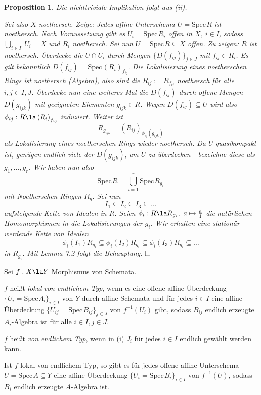 \documentclass[11pt]{book}
\newtheorem{proposition}[theorem]{Proposition}
\theoremstyle{nonumberbreak}
\newenvironment{pr}[1][]{\ifthenelse{\equal{#1}{}}{\proof}{\proof[#1]}\rm}{\endproof}
\newenvironment{definprop}[1][]{\ifthenelse{\equal{#1}{}}{\definiprop}{\definiprop[#1]}\rm}{\enddefiniprop}
\newcommand{\spec}{\mathrm{Spec} \hspace{1pt} }
\begin{document}
\begin{spacing}{1.4}
\begin{proposition}
\begin{pr}
\comp
\item Die nichttriviale Implikation folgt aus (ii).
\item Sei also $X$ noethersch. Zeige: Jedes affine Unterschema $U = \spec R$ ist noethersch. Nach Voraussetzung gibt es $U_i = \spec R_i$ offen in $X$, $i \in I$, sodass $\bigcup_{i \in I} \ U_i = X$ und $R_i$ noethersch. Sei nun $U = \spec R \subseteq X$ offen. Zu zeigen: $R$ ist noethersch. Überdecke die $U \cap U_i$ durch Mengen $\{D(f_{ij})\}_{j \in J}$ mit $f_{ij} \in R_i$. Es gilt bekanntlich $D(f_{ij}) = \spec \left(R_i\right)_{f_{ij}}$. Die Lokalisierung eines noetherschen Rings ist noethersch (Algebra), also sind die $R_{ij} := R_{f_{ij}}$ noethersch für alle $i,j \in I,J$. Überdecke nun eine weiteres Mal die $D(f_{ij})$ durch offene Mengen $D(g_{ijk})$ mit geeigneten Elementen $g_{ijk} \in R$. Wegen $D(f_{ij}) \subseteq U$ wird also $\phi_{ij}: R \la \left(R_i\right)_{f_{ij}}$ induziert. Weiter ist 
$$R_{g_{ijk}} = \left(R_{ij}\right)_{\phi_{ij}(g_{ijk})}$$
als Lokalisierung eines noetherschen Rings wieder noethersch. Da $U$ quasikompakt ist, genügen endlich viele der $D(g_{ijk})$, um $U$ zu überdecken - bezeichne diese als $g_1, \ldots, g_r$. Wir haben nun also 
$$\spec R = \bigcup_{i=1}^r \spec R_{g_i}$$
mit Noetherschen Ringen $R_g$. Sei nun
$$I_1 \subseteq I_2 \subseteq I_3 \subseteq \ldots$$
aufsteigende Kette von Idealen in $R$. Seien $\phi_i: R \la R_{g_i}, \ a \mapsto \frac{a}{1}$ die natürlichen Homomorphismen in die Lokalisierungen der $g_i$. Wir erhalten eine stationär werdende Kette von Idealen 
$$\phi_i (I_1) R_{g_i} \subseteq \phi_i(I_2) R_{g_i} \subseteq \phi_i(I_3) R_{g_i} \subseteq \ldots $$
in $R_{g_i}$. Mit Lemma 7.2 folgt die Behauptung. $\hfill \Box$

\cend
\end{pr}

\end{proposition}



\begin{definprop}
Sei $f: X \la Y$ Morphismus von Schemata.
\comp
\item $f$ heißt \textit{lokal von endlichem Typ}, wenn es eine offene affine Überdeckung $\{U_i = \spec A_i\}_{i \in I}$ von $Y$ durch affine Schemata und für jedes $i \in I$ eine affine Überdeckung $\{U_{ij}= \spec B_{ij} \}_{j \in J}$ von $f^{-1}(U_i)$ gibt, sodass $B_{ij}$ endlich erzeugte $A_i$-Algebra ist für alle $i \in I, j \in J$.
\item $f$ heißt \textit{von endlichem Typ}, wenn in (i) $J_i$ für jedes $i \in I$ endlich gewählt werden kann.
\item Ist $f$ lokal von endlichem Typ, so gibt es für jedes offene affine Unterschema $U = \spec A \subseteq Y$ eine affine Überdeckung $\{U_{i} = \spec B_{i}\}_{i \in I}$ von $f^{-1}(U)$, sodass $B_{i}$ endlich erzeugte $A$-Algebra ist.
\cend


\end{definprop}
\end{spacing}
\end{document}
